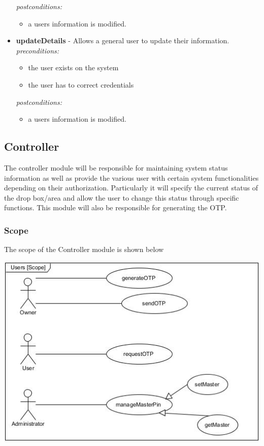 \documentclass[a4paper,12pt]{article}
\begin{document}
\begin{itemize}
		\textit{postconditions:}
			\begin{itemize}
				\item a users information is modified.\\[0.5cm]
			\end{itemize}
			
		\item \textbf{updateDetails} - Allows a general user to update their information.\\[0.5cm]
		\textit{preconditions:}
			\begin{itemize}
				\item the user exists on the system
				\item the user has to correct credentials
			\end{itemize}
		
		\textit{postconditions:}
			\begin{itemize}
				\item a users information is modified.
			\end{itemize}
	\end{itemize}
	
	\newpage
	\subsection{Controller}
	The controller module will be responsible for maintaining system status information as well as provide the various user with certain system functionalities depending on their authorization. Particularly it will specify the current status of the drop box/area and allow the user to change this status through specific functions. This module will also be responsible for generating the OTP.
	
	\subsubsection{Scope}
	The scope of the Controller module is shown below
	
	\includegraphics[width=1\textwidth]{./Pictures/UML/controllerScope.jpg}\\[1.5cm]
	
\end{document}
